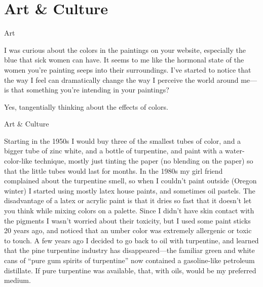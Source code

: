 \documentclass[11pt,oneside,openany,extrafontsizes]{memoir}
\begin{document}
\section{Art \& Culture}

\begin{qaexchange}{Art}

    \begin{question}
        I was curious about the colors in the paintings on your website, especially the blue that sick women can have. It seems to me like the hormonal state of the women you're painting seeps into their surroundings. I've started to notice that the way I feel can dramatically change the way I perceive the world around me---is that something you're intending in your paintings?
    \end{question}

    \begin{answer}
      Yes, tangentially thinking about the effects of colors.
    \end{answer}
\end{qaexchange}

\begin{standalonequote}{Art \& Culture}

    \begin{answer}
      Starting in the 1950s I would buy three of the smallest tubes of color, and a bigger tube of zinc white, and a bottle of turpentine, and paint with a water-color-like technique, mostly just tinting the paper (no blending on the paper) so that the little tubes would last for months. In the 1980s my girl friend complained about the turpentine smell, so when I couldn't paint outside (Oregon winter) I started using mostly latex house paints, and sometimes oil pastels. The disadvantage of a latex or acrylic paint is that it dries so fast that it doesn't let you think while mixing colors on a palette. Since I didn't have skin contact with the pigments I wasn't worried about their toxicity, but I used some paint sticks 20 years ago, and noticed that an umber color was extremely allergenic or toxic to touch. A few years ago I decided to go back to oil with turpentine, and learned that the pine turpentine industry has disappeared—the familiar green and white cans of \enquote{pure gum spirits of turpentine} now contained a gasoline-like petroleum distillate. If pure turpentine was available, that, with oils, would be my preferred medium.
    \end{answer}
\end{standalonequote}
\end{document}
